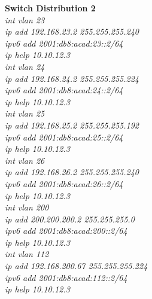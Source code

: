 \documentclass[12pt,a4paper]{report}
\begin{document}
\hspace*{1cm}\textbf{Switch Distribution 2}\\
\hspace*{2cm}\textit{int vlan 23\\
\hspace*{2cm}ip add 192.168.23.2 255.255.255.240\\
\hspace*{2cm}ipv6 add 2001:db8:acad:23::2/64\\
\hspace*{2cm}ip help 10.10.12.3\\
\hspace*{2cm}int vlan 24\\
\hspace*{2cm}ip add 192.168.24.2 255.255.255.224\\
\hspace*{2cm}ipv6 add 2001:db8:acad:24::2/64\\
\hspace*{2cm}ip help 10.10.12.3\\
\hspace*{2cm}int vlan 25\\
\hspace*{2cm}ip add 192.168.25.2 255.255.255.192\\
\hspace*{2cm}ipv6 add 2001:db8:acad:25::2/64\\
\hspace*{2cm}ip help 10.10.12.3\\
\hspace*{2cm}int vlan 26\\
\hspace*{2cm}ip add 192.168.26.2 255.255.255.240\\
\hspace*{2cm}ipv6 add 2001:db8:acad:26::2/64\\
\hspace*{2cm}ip help 10.10.12.3\\
\hspace*{2cm}int vlan 200\\
\hspace*{2cm}ip add 200.200.200.2 255.255.255.0\\
\hspace*{2cm}ipv6 add 2001:db8:acad:200::2/64\\
\hspace*{2cm}ip help 10.10.12.3\\
\hspace*{2cm}int vlan 112\\
\hspace*{2cm}ip add 192.168.200.67 255.255.255.224 \\
\hspace*{2cm}ipv6 add 2001:db8:acad:112::2/64\\
\hspace*{2cm}ip help 10.10.12.3\\}
\end{document}
